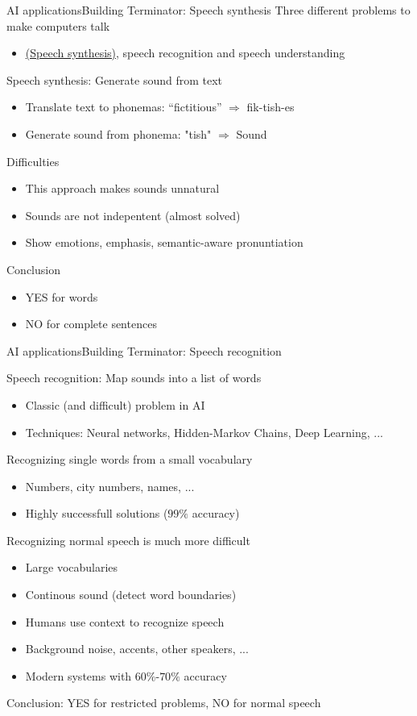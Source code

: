 \documentclass[10pt,compress]{beamer} %
\begin{document}
\begin{frame}{AI applications}{Building Terminator: Speech synthesis}
	Three different problems to make computers talk
	\begin{itemize}
		\item \href{https://youtu.be/SYJCWStejSc?t=65}{(Speech synthesis)}, speech recognition and speech understanding
	\end{itemize}
	Speech synthesis: Generate sound from text
	\begin{itemize}
		\item Translate text to phonemas: “fictitious”  $\Rightarrow$ fik-tish-es
		\item Generate sound from phonema: "tish" $\Rightarrow$ Sound
	\end{itemize}
	Difficulties
	\begin{itemize}
		\item This approach makes sounds unnatural
		\item Sounds are not indepentent (almost solved)
		\item Show emotions, emphasis, semantic-aware pronuntiation
	\end{itemize}
	Conclusion
	\begin{itemize}
		\item YES for words
		\item NO for complete sentences
	\end{itemize}
\end{frame}

\begin{frame}{AI applications}{Building Terminator: Speech recognition}
\footnotesize{
	Speech recognition: Map sounds into a list of words
	\begin{itemize}
		\item Classic (and difficult) problem in AI
		\item Techniques: Neural networks, Hidden-Markov Chains, Deep Learning, ...
	\end{itemize}
	Recognizing single words from a small vocabulary
	\begin{itemize}
		\item Numbers, city numbers, names, ...
		\item Highly successfull solutions ($99\%$ accuracy)
	\end{itemize}
	Recognizing normal speech is much more difficult
	\begin{itemize}
		\item Large vocabularies
		\item Continous sound (detect word boundaries)
		\item Humans use context to recognize speech
		\item Background noise, accents, other speakers, ...
		\item Modern systems with $60\%$-$70\%$ accuracy
	\end{itemize}
	Conclusion: YES for restricted problems, NO for normal speech
}
\end{frame}
\end{document}
